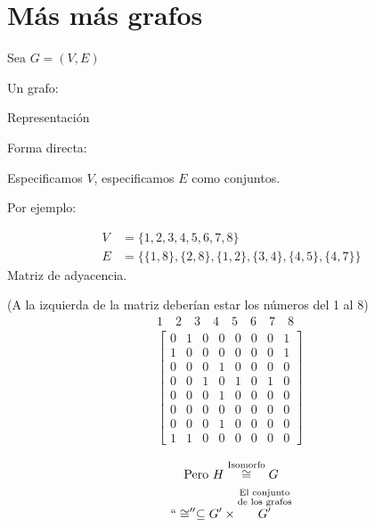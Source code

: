 \documentclass[../main.tex]{subfiles}
\begin{document}
\chapter{Más más grafos}%

\thispagestyle{fancy}

Sea $G=(V,E)$

Un grafo:

Representación

Forma directa:

Especificamos $V$, especificamos $E$ como conjuntos.

Por ejemplo:

\begin{figure}[H]
	\centering
	
\end{figure}

\begin{align*}
	V&=\{1,2,3,4,5,6,7,8\}\\
	E&=\{
		\{1,8\},
		\{2,8\},
		\{1,2\},
		\{3,4\},
		\{4,5\},
		\{4,7\}
	\}
\end{align*}
Matriz de adyacencia.

(A la izquierda de la matriz deberían estar los números del 1 al 8)
\begin{align*}
	1\quad
	2\quad
	3\quad
	4\quad
	5\quad
	6\quad
	7\quad
	8\quad\\
	\begin{bmatrix}
		0 & 1 & 0 & 0 & 0 & 0 & 0 & 1\\
		1 & 0 & 0 & 0 & 0 & 0 & 0 & 1\\
		0 & 0 & 0 & 1 & 0 & 0 & 0 & 0\\
		0 & 0 & 1 & 0 & 1 & 0 & 1 & 0\\
		0 & 0 & 0 & 1 & 0 & 0 & 0 & 0\\
		0 & 0 & 0 & 0 & 0 & 0 & 0 & 0\\
		0 & 0 & 0 & 1 & 0 & 0 & 0 & 0\\
		1 & 1 & 0 & 0 & 0 & 0 & 0 & 0
	\end{bmatrix}
\end{align*}

\begin{figure}[H]
	\centering
	
\end{figure}

\begin{gather*}
	\text{Pero } H
	\overset
	{
		\text{Isomorfo}
	}
	{
		\cong
	}
	G\\
	``\cong'' \subseteq G' \times
	\overset
	{
		\substack
		{
			\text{El conjunto}\\
			\text{de los grafos}
		}
	}
	{
		G'
	}
\end{gather*}
\end{document}
